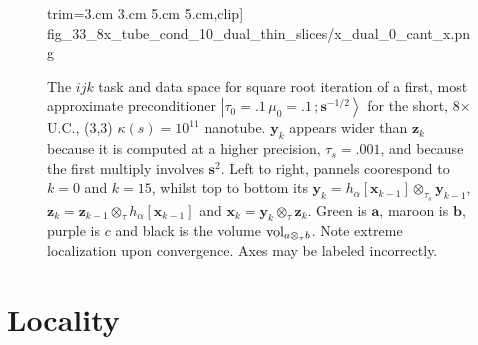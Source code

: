 \documentclass[letterpaper,twocolumn,amsmath,amsfont,amssymb,english,aps,jcp,preprintnumbers,groupaddress,nofootinbib,tightenlines,floatfix]{revtex4}
\newcommand{\mat}[1]{\boldsymbol{#1}}
\newcommand{\ot}{  {\scriptstyle \otimes}_{ \tau } }
\newcommand{\ots}{ {\scriptstyle \otimes}_{ \! \tau_s } }
\theoremstyle{plain}
\theoremstyle{remark}
\theoremstyle{plain}
\begin{document}
\begin{figure}[h]
{                        trim={3.cm 3.cm 5.cm 5.cm},clip]
                        {fig_33_8x_tube_cond_10_dual_thin_slices/x_dual_0_cant_x.png}} 
\caption{
The $ijk$ task and data space for square root iteration of a first, most approximate preconditioner 
$\left|\tau_0=.1\,\mu_0=.1\, ; \scriptstyle{\mat{s}^{-1/2}} \right>$ for the short, 8$\times$ U.C., (3,3) $\kappa(s)=10^{11}$ nanotube.
$\mat{y}_k$ appears wider than $\mat{z}_k$ because it is computed at a higher precision, $\tau_s=.001$,
and because the first multiply involves $\mat{s}^2$.  Left to right, pannels 
coorespond to $k=0$ and $k=15$, whilst top to bottom its $\mat{y}_k=h_\alpha[ \mat{x}_{k-1} ] \ots \mat{y}_{k-1}$,
$\mat{z}_k=  \mat{z}_{k-1}  \ot h_\alpha[ \mat{x}_{k-1} ]$ and 
$\mat{x}_k=  \mat{y}_{k}  \ot \mat{z}_{k}$.  Green is $\mat{a}$, maroon is $\mat{b}$, purple is $c$ and black is the volume ${\rm vol}_{a \ot b}$.
Note extreme localization upon convergence. Axes may be labeled incorrectly. }
\end{figure}

\section{Locality} 
\end{document}
